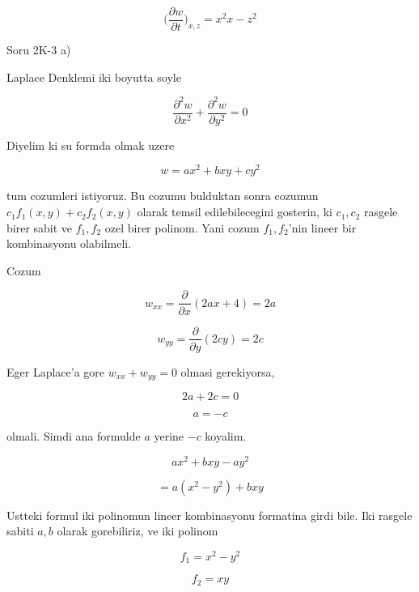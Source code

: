\documentclass[12pt,fleqn]{article}
\begin{document}
\[ \bigg( \frac{\partial w}{\partial t}  \bigg)_{x,z} = x^2x-z^2 \]

Soru 2K-3 a)

Laplace Denklemi iki boyutta soyle

\[ \frac{\partial^2 w}{\partial x^2} + 
\frac{\partial^2 w}{\partial y^2}  = 0
 \]

Diyelim ki su formda olmak uzere

\[ w = ax^2 + bxy + cy^2 \]

tum cozumleri istiyoruz. Bu cozumu bulduktan sonra cozumun $c_1f_1(x,y) +
c_2f_2(x,y)$ 
olarak temsil edilebilecegini gosterin, ki $c_1,c_2$ rasgele
birer sabit ve $f_1,f_2$ ozel birer polinom. Yani cozum $f_1,f_2$'nin
lineer bir kombinasyonu olabilmeli.

Cozum 

\[ w_{xx} = \frac{\partial }{\partial x} (2ax + 4) = 2a \]

\[ w_{yy} = \frac{\partial }{\partial y} (2cy) = 2c \]

Eger Laplace'a gore $w_{xx} + w_{yy} = 0$ olmasi gerekiyorsa,

\[ 2a + 2c = 0 \]

\[ a = -c \]

olmali. Simdi ana formulde $a$ yerine $-c$ koyalim. 

\[ ax^2 + bxy -ay^2 \]

\[ = a(x^2-y^2) + bxy \]

Ustteki formul iki polinomun lineer kombinasyonu formatina girdi bile. Iki
rasgele sabiti $a,b$ olarak gorebiliriz, ve iki polinom

\[ f_1 = x^2-y^2 \]

\[ f_2 = xy \]
\end{document}
